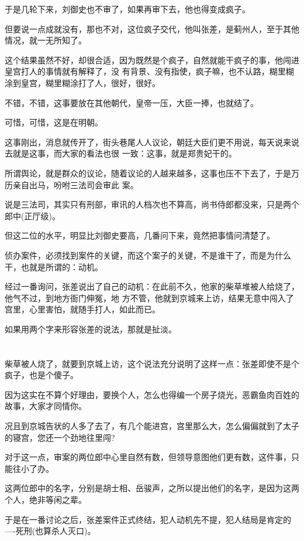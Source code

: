 \documentclass[11pt,a4paper,onecolumn]{article}
\begin{document}
于是几轮下来，刘御史也不审了，如果再审下去，他也得变成疯子。

但要说一点成就没有，那也不对，这位疯子交代，他叫张差，是蓟州人，至于其他情况，就一无所知了。

这个结果虽然不好，却很合适，因为既然是个疯子，自然就能干疯子的事，他闯进皇宫打人的事情就有解释了，没
有背景、没有指使，疯子嘛，也不认路，糊里糊涂到皇宫，糊里糊涂打了人，很好，很好。

不错，不错，这事要放在其他朝代，皇帝一压，大臣一捧，也就结了。

可惜，可惜，这是在明朝。

这事刚出，消息就传开了，街头巷尾人人议论，朝廷大臣们更不用说，每天说来说去就是这事，而大家的看法也很
一致：这事，就是郑贵妃干的。

所谓舆论，就是群众的议论，随着议论的人越来越多，这事也压不下去了，于是万历亲自出马，吩咐三法司会审此
案。

说是三法司，其实只有刑部，审讯的人档次也不算高，尚书侍郎都没来，只是两个郎中(正厅级)。

但这二位的水平，明显比刘御史要高，几番问下来，竟然把事情问清楚了。

侦办案件，必须找到案件的关键，而这个案子的关键，不是谁干了，而是为什么干，也就是所谓的：动机。

经过一番询问，张差说出了自己的动机：在此前不久，他家的柴草堆被人给烧了，他气不过，到地方衙门伸冤，地
方不管，他就到京城来上访，结果无意中闯入了宫里，心里害怕，就随手打人，如此而已。

如果用两个字来形容张差的说法，那就是扯淡。

\section[\thesection]{}

柴草被人烧了，就要到京城上访，这个说法充分说明了这样一点：张差即使不是个疯子，也是个傻子。

因为这实在不算个好理由，要换个人，怎么也得编一个房子烧光，恶霸鱼肉百姓的故事，大家才同情你。

况且到京城告状的人多了去了，有几个能进宫，宫里那么大，怎么偏偏就到了太子的寝宫，您还一个劲地往里闯?

对于这一点，审案的两位郎中心里自然有数，但领导意图他们更有数，这件事，只能往小了办。

这两位郎中的名字，分别是胡士相、岳骏声，之所以提出他们的名字，是因为这两个人，绝非等闲之辈。

于是在一番讨论之后，张差案件正式终结，犯人动机先不提，犯人结局是肯定的----死刑(也算杀人灭口)。
\end{document}
